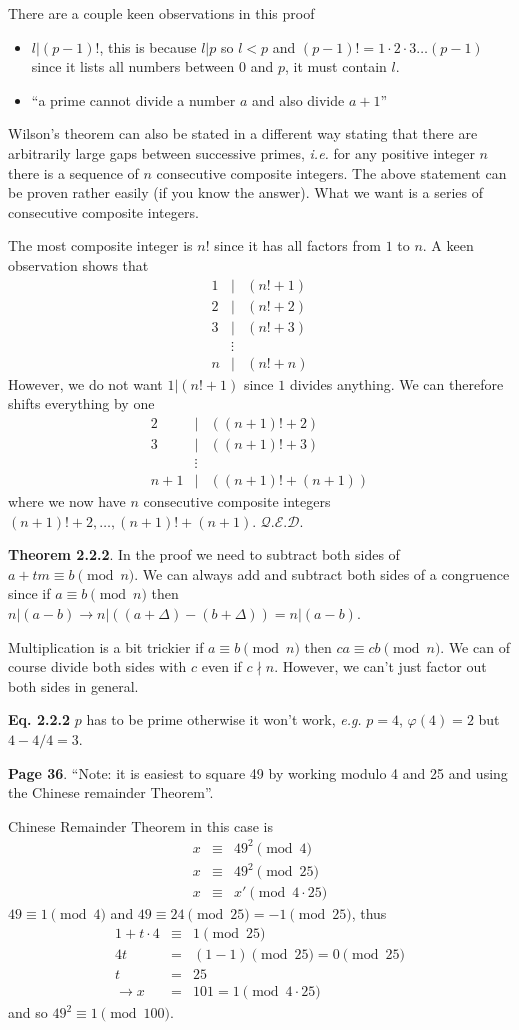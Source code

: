 \documentclass[aps,preprint,preprintnumbers,nofootinbib,showpacs,prd]{revtex4-1}
\newcommand{\ie}{{\it i.e.} }
\newcommand{\eg}{{\it e.g.} }
\newcommand{\bit}{\begin{itemize}}
\newcommand{\eit}{\end{itemize}}
\newcommand{\nbea}{\begin{eqnarray*}}
\newcommand{\neea}{\end{eqnarray*}}
\begin{document}
There are a couple keen observations in this proof
\bit
\item $l|(p-1)!$, this is because $l|p$ so $l < p$ and $(p-1)! = 1\cdot 2\cdot 3 \dots (p-1)$ since it lists all numbers between 0 and $p$, it must contain $l$.
\item ``a prime cannot divide a number $a$ and also divide $a+1$''
\eit

Wilson's theorem can also be stated in a different way stating that there are arbitrarily large gaps between successive primes, \ie for any positive integer $n$ there is a sequence of $n$ consecutive composite integers. The above statement can be proven rather easily (if you know the answer). What we want is a series of consecutive composite integers.

The most composite integer is $n!$ since it has all factors from $1$ to $n$. A keen observation shows that
%
\nbea
1 &|& (n! + 1) \\
2 &|& (n! + 2) \\
3 &|& (n! + 3) \\
&\vdots& \\
n &|& (n! + n)
\neea
%
However, we do not want $1|(n! + 1)$ since $1$ divides anything. We can therefore shifts everything by one
%
\nbea
2 &|& ((n+1)! + 2) \\
3 &|& ((n+1)! + 3) \\
&\vdots& \\
n+1 &|& ((n+1)! +(n+1))
\neea
%
where we now have $n$ consecutive composite integers $(n+1)! + 2 , \dots, (n+1)! +(n+1)$. $\mathcal{Q.E.D}$.

{\bf Theorem 2.2.2}. In the proof we need to subtract both sides of $a + tm \equiv b \pmod{n}$. We can always add and subtract both sides of a congruence since if $a \equiv b \pmod{n}$ then $n|(a-b) \to n|((a+\Delta) - (b + \Delta)) = n|(a-b)$.

Multiplication is a bit trickier if $a \equiv b \pmod{n}$ then $ca \equiv cb \pmod{n}$. We can of course divide both sides with $c$ even if $c \nmid n$. However, we can't just factor out both sides in general.

{\bf Eq. 2.2.2} $p$ has to be prime otherwise it won't work, \eg $p=4$, $\varphi(4) = 2$ but $4 - 4/4 = 3$.

{\bf Page 36}. ``Note: it is easiest to square 49 by working modulo 4 and 25 and using the Chinese remainder Theorem''.

Chinese Remainder Theorem in this case is
%
\nbea
x & \equiv & 49^2 \pmod{4} \\
x & \equiv & 49^2 \pmod{25} \\
x & \equiv & x' \pmod{4\cdot 25}
\neea
%
$49 \equiv 1 \pmod{4}$ and $49 \equiv 24 \pmod{25} = -1 \pmod{25}$, thus
%
\nbea
1 + t\cdot 4 & \equiv & 1 \pmod{25} \\
4t & = & (1-1) \pmod{25}  = 0 \pmod{25} \\
t & = & 25 \\
\to x & = & 101  = 1 \pmod{4 \cdot 25}
\neea
%
and so $49^2 \equiv 1 \pmod{100}$.
\end{document}
